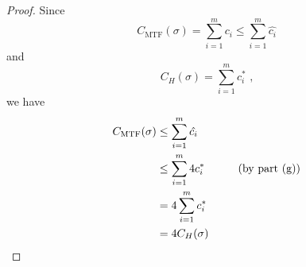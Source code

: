 \begin{proof}
    Since
    \begin{equation*}
        C_{\text{MTF}}(\sigma) = \sum\limits_{i = 1}^m c_i
        \leq \sum\limits_{i = 1}^m \hat{c_i}
    \end{equation*}
    and
    \begin{equation*}
        C_H(\sigma) = \sum\limits_{i = 1}^m c_i^* \text{ ,}
    \end{equation*}
    we have
    \begin{equation*}
    \begin{split}
        C_{\text{MTF}}(\sigma) & \leq \sum\limits_{i = 1}^m \hat{c_i} \\
        & \leq \sum\limits_{i = 1}^m 4 c_i^* \text{\quad\quad\quad(by part (g))} \\
        & = 4 \sum\limits_{i = 1}^m c_i^* \\
        & = 4 C_H(\sigma) \\
    \end{split}
    \end{equation*}
\end{proof}

 